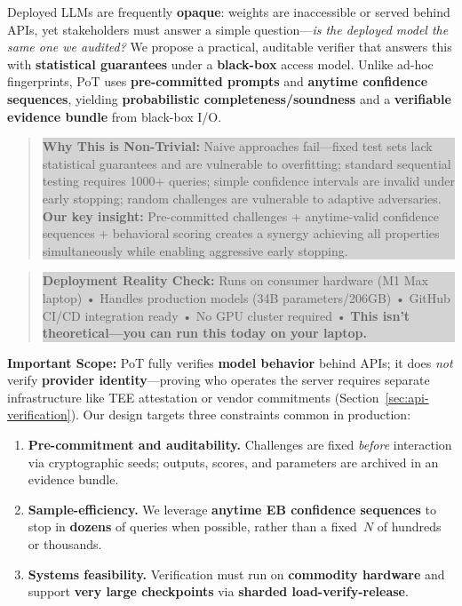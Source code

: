 \documentclass[11pt]{article}
\begin{document}
Deployed LLMs are frequently \textbf{opaque}: weights are inaccessible or served behind APIs, yet stakeholders must answer a simple question---\emph{is the deployed model the same one we audited?} We propose a practical, auditable verifier that answers this with \textbf{statistical guarantees} under a \textbf{black-box} access model. Unlike ad-hoc fingerprints, PoT uses \textbf{pre-committed prompts} and \textbf{anytime confidence sequences}, yielding \textbf{probabilistic completeness/soundness} and a \textbf{verifiable evidence bundle} from black-box I/O\@.

\begin{quote}
\colorbox{lightgray}{\parbox{0.95\textwidth}{\textbf{Why This is Non-Trivial:} Naive approaches fail---fixed test sets lack statistical guarantees and are vulnerable to overfitting; standard sequential testing requires 1000+ queries; simple confidence intervals are invalid under early stopping; random challenges are vulnerable to adaptive adversaries. \textbf{Our key insight:} Pre-committed challenges + anytime-valid confidence sequences + behavioral scoring creates a synergy achieving all properties simultaneously while enabling aggressive early stopping.}}
\end{quote}

\begin{quote}
\colorbox{lightgray}{\parbox{0.95\textwidth}{\textbf{Deployment Reality Check:} Runs on consumer hardware (M1 Max laptop) • Handles production models (34B parameters/206GB) • GitHub CI/CD integration ready • No GPU cluster required • \textbf{This isn't theoretical---you can run this today on your laptop.}}}
\end{quote}

\textbf{Important Scope:} PoT fully verifies \textbf{model behavior} behind APIs; it does \emph{not} verify \textbf{provider identity}---proving who operates the server requires separate infrastructure like TEE attestation or vendor commitments (Section~\ref{sec:api-verification}). Our design targets three constraints common in production:

\begin{enumerate}
\item \textbf{Pre-commitment and auditability.} Challenges are fixed \emph{before} interaction via cryptographic seeds; outputs, scores, and parameters are archived in an evidence bundle.
\item \textbf{Sample-efficiency.} We leverage \textbf{anytime EB confidence sequences} to stop in \textbf{dozens} of queries when possible, rather than a fixed~$N$ of hundreds or thousands.
\item \textbf{Systems feasibility.} Verification must run on \textbf{commodity hardware} and support \textbf{very large checkpoints} via \textbf{sharded load-verify-release}.
\end{enumerate}
\end{document}
